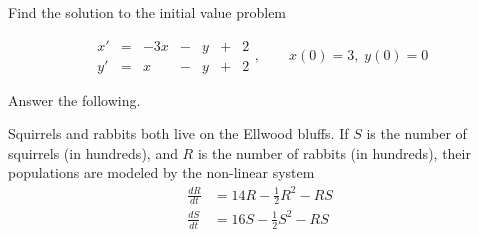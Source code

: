 \documentclass[addpoints,12pt]{exam}
\begin{document}
\newpage
\begin{questions}
 
 \question[10] Find the solution to the initial value problem
 
 $$\begin{array}{ccccccc}
  x' & = & -3x & - & y&+&2 \\
  y' & = & x & - & y&+&2
 \end{array},\qquad x(0)=3,\;y(0)=0$$
 
 \newpage
 
  \question[18] Answer the following.
 
 \newpage
 
 \question[12] Squirrels and rabbits both live on the Ellwood bluffs. If $S$ is the number of squirrels (in hundreds), and $R$ is the number of rabbits (in hundreds), their populations are modeled by the non-linear system
 \begin{align*}
  \frac{dR}{dt}&=14R-\frac{1}{2}R^2-RS\\
  \frac{dS}{dt}&=16S-\frac{1}{2}S^2-RS
 \end{align*}
\end{questions}
\end{document}
